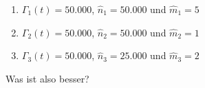 \begin{Example*}
\begin{enumerate}
  \item $\Gamma_1(t) = 50.000$, $\widehat{n}_1 = 50.000$ und $\widehat{m}_1 = 5$
  \item $\Gamma_2(t) = 50.000$, $\widehat{n}_2 = 50.000$ und $\widehat{m}_2 = 1$
  \item $\Gamma_3(t) = 50.000$, $\widehat{n}_3 = 25.000$ und $\widehat{m}_3 = 2$
\end{enumerate}

\vspace{0.3cm}

Was ist also besser?

\end{Example*}

\vspace{0.6cm}

